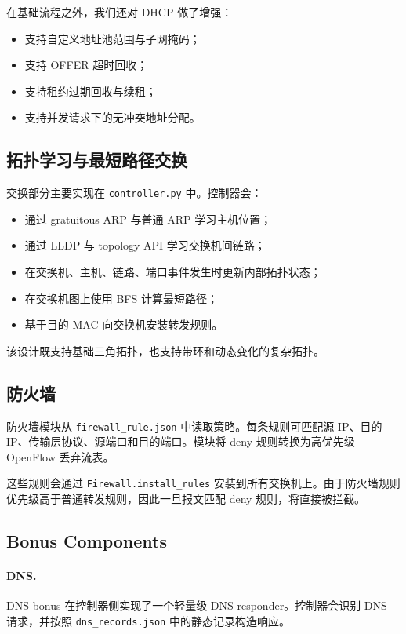 \documentclass[11pt,a4paper]{ctexart}
\begin{document}
在基础流程之外，我们还对 DHCP 做了增强：

\begin{itemize}[leftmargin=1.5em]
    \item 支持自定义地址池范围与子网掩码；
    \item 支持 OFFER 超时回收；
    \item 支持租约过期回收与续租；
    \item 支持并发请求下的无冲突地址分配。
\end{itemize}

\subsection{拓扑学习与最短路径交换}

交换部分主要实现在 \texttt{controller.py} 中。控制器会：

\begin{itemize}[leftmargin=1.5em]
    \item 通过 gratuitous ARP 与普通 ARP 学习主机位置；
    \item 通过 LLDP 与 topology API 学习交换机间链路；
    \item 在交换机、主机、链路、端口事件发生时更新内部拓扑状态；
    \item 在交换机图上使用 BFS 计算最短路径；
    \item 基于目的 MAC 向交换机安装转发规则。
\end{itemize}

该设计既支持基础三角拓扑，也支持带环和动态变化的复杂拓扑。

\subsection{防火墙}

防火墙模块从 \texttt{firewall\_rule.json} 中读取策略。每条规则可匹配源 IP、目的 IP、传输层协议、源端口和目的端口。模块将 deny 规则转换为高优先级 OpenFlow 丢弃流表。

这些规则会通过 \texttt{Firewall.install\_rules} 安装到所有交换机上。由于防火墙规则优先级高于普通转发规则，因此一旦报文匹配 deny 规则，将直接被拦截。

\subsection{Bonus Components}

\paragraph{DNS.}
DNS bonus 在控制器侧实现了一个轻量级 DNS responder。控制器会识别 DNS 请求，并按照 \texttt{dns\_records.json} 中的静态记录构造响应。
\end{document}
